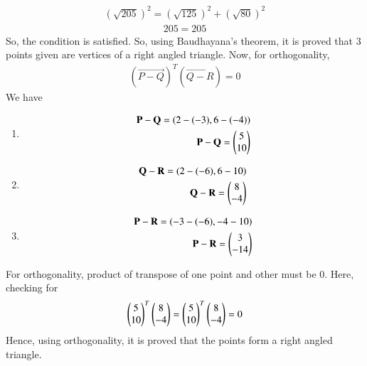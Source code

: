 \begin{align}
  (\sqrt{205})^2 = (\sqrt{125})^2 + (\sqrt{80})^2
\end{align}
\begin{align}
  205 = 205
\end{align}
So, the condition is satisfied. 
So, using Baudhayana's theorem, it is proved that 3 points given are vertices of a right angled triangle. 
Now, for orthogonality, 
\begin{align}
    (\vec{P-Q})^T(\vec{Q-R}) = 0
\end{align}
We have 
\begin{enumerate}
    
    \item \begin{align}
    \mathbf{P-Q} = (2-(-3), 6-(-4))
\\
\mathbf{P-Q} = \begin{pmatrix}
5\\
10 
\end{pmatrix}
\end{align}
    \item \begin{align}
    \mathbf{Q-R} = (2-(-6), 6-10)
\\
\mathbf{Q-R} = \begin{pmatrix}
8\\
-4 
\end{pmatrix}
\end{align}
\item \begin{align}
    \mathbf{P-R} = (-3-(-6), -4-10)
\\
\mathbf{P-R} = \begin{pmatrix}
3\\
-14 
\end{pmatrix}
\end{align}
\end{enumerate}
For orthogonality, product of transpose of one point and other must be 0. 
Here, checking for 
\begin{align}
    \begin{pmatrix}
5\\
10 
\end{pmatrix}^T\begin{pmatrix} 8\\
-4
\end{pmatrix} =  \begin{pmatrix}
5\\
10
\end{pmatrix}^T \begin{pmatrix}
8 \\ -4
\end{pmatrix}=0
\end{align}
Hence, using orthogonality, it is proved that the points form a right angled triangle. 

